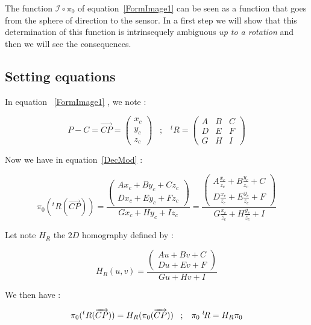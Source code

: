 The function $\mathcal{I} \circ \pi_0$  of equation~\ref{FormImage1} can be seen as a function that
goes from the sphere of direction to the sensor.  In a first
step we will show that this determination of this function is intrinsequely ambiguous
\emph{up to a rotation} and then we will see the consequences.


\subsection{Setting equations}

In equation ~\ref{FormImage1} , we note :

\begin{equation}
	P-C =  \overrightarrow{CP}  = \begin{pmatrix} x_c \\ y_c \\ z_c \end{pmatrix} 
\;\;\;  ;  \;\;\;
        ^t R =  \begin{pmatrix}  A & B & C \\ D & E & F \\ G & H & I \end{pmatrix} 
\end{equation}

Now we have in equation~\ref{DecMod} :

\begin{equation}
	\pi_0(^t R(\overrightarrow{CP})) 
	=  \frac{\begin{pmatrix} Ax_c+By_c+Cz_c \\ Dx_c+Ey_c+Fz_c  \end{pmatrix}}{Gx_c+Hy_c+Iz_c}
		=  \frac{\begin{pmatrix} A\frac{x_c}{z_c}+B\frac{y_c}{z_c}+C \\  D\frac{x_c}{z_c}+E\frac{y_c}{z_c}+F  \end{pmatrix}}
			{G\frac{x_c}{z_c}+H\frac{y_c}{z_c}+I}
\end{equation}

Let note $H_R$ the $2D$  homography defined by :

\begin{equation}
 H_R(u,v) =  \frac{\begin{pmatrix} Au+Bv+C \\  Du+Ev+F  \end{pmatrix}} {Gu+Hv+I}
\end{equation}

We then have :

\begin{equation}
	\pi_0(^t R(\overrightarrow{CP}))  = H_R  (\pi_0 (\overrightarrow{CP}))
\;\;\;  ;  \;\;\;
        \pi_0  \; ^{t} \!  R = H_R  \pi_0
	\label{RotHomog}
\end{equation}

